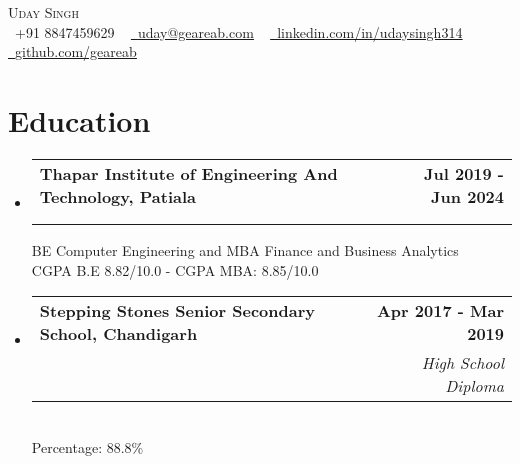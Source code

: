 \documentclass[letterpaper,11pt]{article}
\makeatletter
\newcommand{\resumeSubheading}[4]{
  \vspace{-2pt}\item
    \begin{tabular*}{1.0\textwidth}[t]{l@{\extracolsep{\fill}}r}
      \textbf{#1} & \textbf{\small #2} \\
      \textit{\small#3} & \textit{\small #4} \\
    \end{tabular*}\vspace{-7pt}
}
\newcommand{\resumeSubHeadingListStart}{\begin{itemize}[leftmargin=0.0in, label={}]}
\newcommand{\resumeSubHeadingListEnd}{\end{itemize}}
\makeatother
\begin{document}

\begin{center}
    {\Huge \scshape Uday Singh } \\ \vspace{1pt} \vspace{1pt}
    \small \raisebox{-0.1\height}\faPhone\ +91 8847459629 ~ \href{mailto:uday@geareab.com}{\raisebox{-0.2\height}\faEnvelope\  \underline{uday@geareab.com}} ~ 
    \href{https://www.linkedin.com/in/udaysingh314/}{\raisebox{-0.2\height}\faLinkedin\ \underline{linkedin.com/in/udaysingh314}}  ~
    \href{https://github.com/geareab}{\raisebox{-0.2\height}\faGithub\ \underline{github.com/geareab}}
    \vspace{-8pt}
\end{center}


\section{Education}
  \resumeSubHeadingListStart
    \resumeSubheading
{Thapar Institute of Engineering And Technology, Patiala }{Jul 2019 - Jun 2024}{}
\\{BE Computer Engineering and MBA Finance and Business Analytics}
\\{CGPA B.E 8.82/10.0 - CGPA MBA: 8.85/10.0}

 \resumeSubheading
{Stepping Stones Senior Secondary School, Chandigarh }{Apr 2017 - Mar 2019}{}

{High School Diploma}
\\{Percentage: 88.8\%}

 \resumeSubHeadingListEnd
\vspace{-16pt}
  

  

\end{document}
